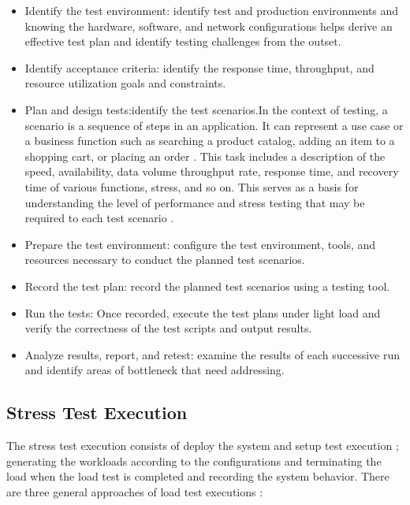 \documentclass{report}
\begin{document}
\begin{itemize}
\item Identify the test environment: identify test and production environments and knowing the hardware, software, and network configurations helps derive an effective test plan and identify testing challenges from the outset.

\item Identify acceptance criteria: identify the response time, throughput, and resource utilization goals and constraints.

\item Plan and design tests:identify the test scenarios.In the context of testing, a scenario is a sequence of steps in an application. It can represent a use case or a business function such as searching a product catalog, adding an item to a shopping cart, or placing an order \cite{Corporation2007}. This task includes a description
of the speed, availability, data volume throughput rate, response
time, and recovery time of various functions, stress, and so on. This
serves as a basis for understanding the level of performance and
stress testing that may be required to each test scenario \cite{Lewis2005}.

\item Prepare the test environment: configure the test environment, tools, and resources necessary to conduct the planned test scenarios.

\item Record the test plan: record the planned test scenarios using a testing tool.

\item Run the tests: Once recorded, execute the test plans under light load and verify the correctness of the test scripts and output results.

\item Analyze results, report, and retest: examine the results of each successive run and identify areas of bottleneck that need addressing.

\end{itemize}



\subsection{Stress Test Execution}

The stress test execution  consists of deploy the system  and setup test execution ; generating the workloads according to the configurations and terminating the load when the load test is completed and recording the system behavior. There are three general approaches of load test executions \cite{Molyneaux2009}\cite{Jiang2010}:
\end{document}
